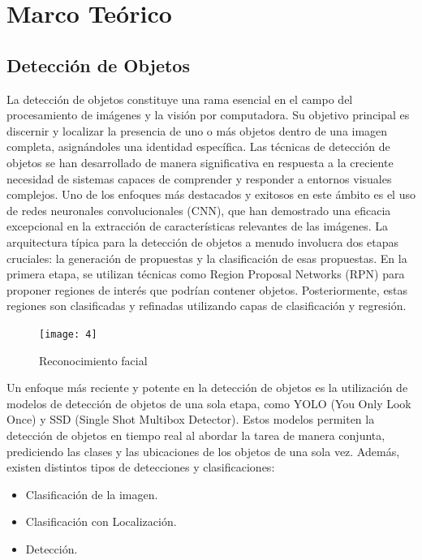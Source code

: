 \clearpage

\section{Marco Teórico}
	\subsection{Detección de Objetos}
	La detección de objetos constituye una rama esencial en el campo del procesamiento de imágenes y la visión por computadora. Su objetivo principal es discernir y localizar la presencia de uno o más objetos dentro de una imagen completa, asignándoles una identidad específica.
Las técnicas de detección de objetos se han desarrollado de manera significativa en respuesta a la creciente necesidad de sistemas capaces de comprender y responder a entornos visuales complejos. Uno de los enfoques más destacados y exitosos en este ámbito es el uso de redes neuronales convolucionales (CNN), que han demostrado una eficacia excepcional en la extracción de características relevantes de las imágenes.
La arquitectura típica para la detección de objetos a menudo involucra dos etapas cruciales: la generación de propuestas y la clasificación de esas propuestas. En la primera etapa, se utilizan técnicas como Region Proposal Networks (RPN) para proponer regiones de interés que podrían contener objetos. Posteriormente, estas regiones son clasificadas y refinadas utilizando capas de clasificación y regresión.

	\begin{figure}[ht]
	    \centering
		\texttt{[image: 4]}
		\caption{Reconocimiento facial}
	\end{figure}		
	
	Un enfoque más reciente y potente en la detección de objetos es la utilización de modelos de detección de objetos de una sola etapa, como YOLO (You Only Look Once) y SSD (Single Shot Multibox Detector). Estos modelos permiten la detección de objetos en tiempo real al abordar la tarea de manera conjunta, prediciendo las clases y las ubicaciones de los objetos de una sola vez.
Además, existen distintos tipos de detecciones y clasificaciones:
	\begin{itemize}
		\item Clasificación de la imagen.
		\item Clasificación con Localización.
		\item Detección.
	\end{itemize}

